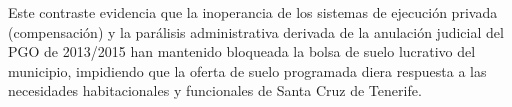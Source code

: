 Este contraste evidencia que la inoperancia de los sistemas de ejecución privada (compensación) y la parálisis administrativa derivada de la anulación judicial del PGO de 2013/2015 han mantenido bloqueada la bolsa de suelo lucrativo del municipio, impidiendo que la oferta de suelo programada diera respuesta a las necesidades habitacionales y funcionales de Santa Cruz de Tenerife.
